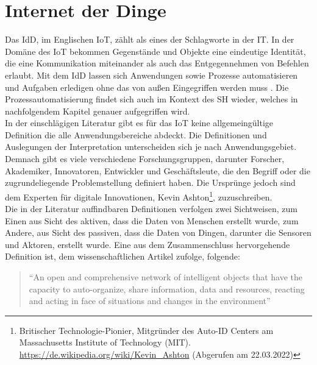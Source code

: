 
\section{Internet der Dinge}
\label{sec:iot}
    Das \ac{IdD}, im Englischen \ac{IoT}, zählt als eines der Schlagworte in der \ac{IT}. In der Domäne des \acs{IoT} bekommen 
    Gegenstände und Objekte eine eindeutige Identität, die eine Kommunikation miteinander als auch das Entgegennehmen von 
    Befehlen erlaubt. Mit dem \acl{IdD} lassen sich Anwendungen sowie Prozesse automatisieren und Aufgaben erledigen ohne das 
    von außen Eingegriffen werden muss \cite{bigdatainsider2016}. Die Prozessautomatisierung findet sich auch im Kontext des 
    \acl{SH} wieder, welches in nachfolgendem Kapitel genauer aufgegriffen wird. 
    \\
    \linebreak
    In der einschlägigen Literatur gibt es für das \acl{IoT} keine allgemeingültige Definition die alle Anwendungsbereiche abdeckt. 
    Die Definitionen und Auslegungen der Interpretation unterscheiden sich je nach Anwendungsgebiet. Demnach gibt es viele verschiedene 
    Forschungsgruppen, darunter Forscher, Akademiker, Innovatoren, Entwickler und Geschäftsleute, die den Begriff oder die zugrundeliegende 
    Problemstellung definiert haben. Die Ursprünge jedoch sind dem Experten für digitale Innovationen, Kevin Ashton\footnote{Britischer Technologie-Pionier, Mitgründer des Auto-ID Centers am Massachusetts Institute of Technology (MIT). \url{https://de.wikipedia.org/wiki/Kevin_Ashton} (Abgerufen am 22.03.2022)}, 
    zuzuschreiben. 
    \\ 
    Die in der Literatur auffindbaren Definitionen verfolgen zwei Sichtweisen, zum Einen aus Sicht des aktiven, dass die Daten von 
    Menschen erstellt wurde, zum Andere, aus Sicht des passiven, dass die Daten von Dingen, darunter die Sensoren und Aktoren, 
    erstellt wurde. \cite{Madakam2015} Eine aus dem Zusammenschluss hervorgehende Definition ist, dem wissenschaftlichen Artikel zufolge, folgende:
    \begin{quote}
        “An open and comprehensive network of intelligent objects that have the capacity to auto-organize, share information, data 
        and resources, reacting and acting in face of situations and changes in the environment” \cite{Madakam2015}
    \end{quote}
